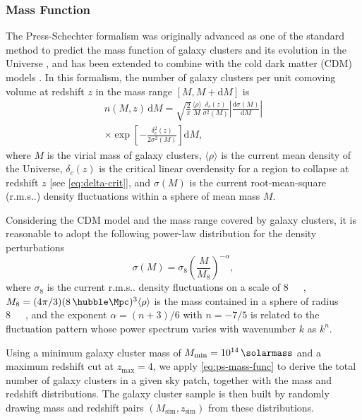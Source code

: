 \documentclass[twocolumn]{aastex62}
\makeatletter
\newcommand{\R}[1]{\mathrm{#1}}
\newcommand{\D}[1]{\R{d} #1}
\newcommand{\diff}[2]{\frac{\D{#1}}{\D{#2}}}
\newcommand{\rms}{r.m.s\@ifnextchar.{}{.\@}}
\makeatother
\begin{document}
\subsubsection{Mass Function}
\label{sec:mass-function}

The Press-Schechter formalism was originally advanced as one of the standard
method to predict the mass function of galaxy clusters and its evolution
in the Universe \citep{press1974}, and has been extended to combine with
the cold dark matter (CDM) models \citep[e.g.,][]{bond1991,lacey1993}.
In this formalism, the number of galaxy clusters per unit comoving volume
at redshift $z$ in the mass range $[M, M + \R{d}M]$ is
\begin{multline}
  \label{eq:ps-mass-func}
  n(M, z) \,\D{M} = \sqrt{\frac{2}{\pi}} \frac{\langle{\rho}\rangle}{M}
  \frac{\delta_c(z)}{\sigma^2(M)} \left| \diff{\sigma(M)}{M} \right| \\
  \times \exp\!\left[ -\frac{\delta_c^2(z)}{2\sigma^2(M)} \right] \D{M},
\end{multline}
where $M$ is the virial mass of galaxy clusters,
$\langle {\rho} \rangle$ is the current mean density of the Universe,
$\delta_c(z)$ is the critical linear overdensity for a region to collapse
at redshift $z$ [see \autoref{eq:delta-crit}],
and $\sigma(M)$ is the current root-mean-square (\rms) density
fluctuations within a sphere of mean mass $M$.

Considering the CDM model and the mass range covered by galaxy clusters,
it is reasonable to adopt the following power-law distribution for the
density perturbations \citep{sarazin2002,randall2002}
\begin{equation}
  \label{eq:sigma-mass}
  \sigma(M) = \sigma_8 \left( \frac{M}{M_8} \right)^{-\alpha},
\end{equation}
where $\sigma_8$ is the current \rms{} density fluctuations on
a scale of \SI{8}{\per\hubble\Mpc},
$M_8 = (4\pi/3)(8 \,\si{\per\hubble\Mpc})^3 \langle{\rho}\rangle$
is the mass contained in a sphere of radius \SI{8}{\per\hubble\Mpc},
and the exponent $\alpha = (n+3)/6$ with $n = -7/5$ \citep{randall2002}
is related to the fluctuation pattern whose power spectrum varies
with wavenumber $k$ as $k^n$.

Using a minimum galaxy cluster mass of
$M_{\R{min}} = \SI{e14}{\solarmass}$
and a maximum redshift cut at $z_{\R{max}} = 4$,
we apply \autoref{eq:ps-mass-func} to derive the total number of
galaxy clusters in a given sky patch, together with the mass and
redshift distributions.
The galaxy cluster sample is then built by randomly drawing mass and
redshift pairs $(M_{\R{sim}}, z_{\R{sim}})$ from these distributions.
\end{document}
